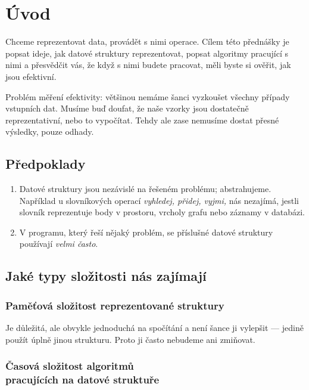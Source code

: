 
\chapter{Úvod}

Chceme reprezentovat data, provádět s nimi operace. Cílem této
přednášky je popsat ideje, jak datové struktury reprezentovat, popsat
algoritmy pracující s nimi a přesvědčit vás, že když s nimi budete
pracovat, měli byste si ověřit, jak jsou efektivní.

Problém měření efektivity: většinou nemáme šanci vyzkoušet všechny
případy vstupních dat. Musíme buď doufat, že naše vzorky jsou
dostatečně reprezentativní, nebo to vypočítat. Tehdy ale zase nemusíme
dostat přesné výsledky, pouze odhady.

\section{Předpoklady}

\begin{enumerate}
\item Datové struktury jsou nezávislé na řešeném problému;
abstrahujeme. Například u slovníkových operací {\it vyhledej, přidej,
vyjmi,\/} nás nezajímá, jestli slovník reprezentuje body v prostoru,
vrcholy grafu nebo záznamy v databázi.
\item V programu, který řeší nějaký problém, se příslušné datové
struktury používají {\em velmi často}.
\end{enumerate}

\section{Jaké typy složitosti nás zajímají}

\subsection{Paměťová složitost reprezentované struktury}
Je důležitá, ale obvykle jednoduchá na spočítání a není šance ji
vylepšit --- jedině použít úplně jinou strukturu. Proto ji často
nebudeme ani zmiňovat.

\subsection{Časová složitost algoritmů\\ pracujících na datové struktuře}

